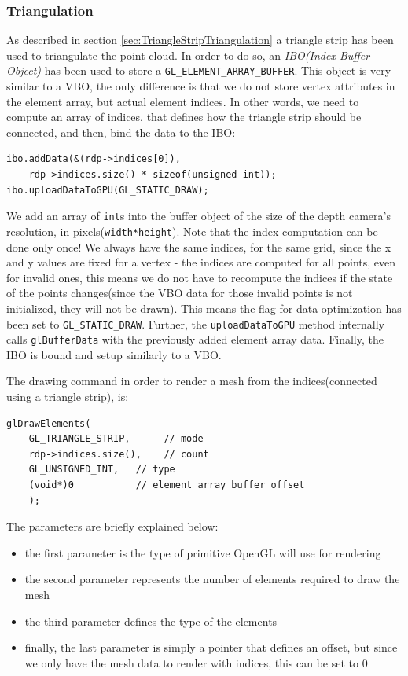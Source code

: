\documentclass[]{article}
\begin{document}
\subsubsection{Triangulation}

As described in section \ref{sec:TriangleStripTriangulation} a triangle strip has been used to triangulate the point cloud. In order to do so, an \textit{IBO(Index Buffer Object)} has been used to store a \verb|GL_ELEMENT_ARRAY_BUFFER|. This object is very similar to a VBO, the only difference is that we do not store vertex attributes in the element array, but actual element indices. In other words, we need to compute an array of indices, that defines how the triangle strip should be connected, and then, bind the data to the IBO:
\begin{verbatim}
ibo.addData(&(rdp->indices[0]), 
    rdp->indices.size() * sizeof(unsigned int));
ibo.uploadDataToGPU(GL_STATIC_DRAW);
\end{verbatim}

We add an array of \verb|int|s into the buffer object of the size of the depth camera's resolution, in pixels(\verb|width*height|). Note that the index computation can be done only once! We always have the same indices, for the same grid, since the x and y values are fixed for a vertex - the indices are computed for all points, even for invalid ones, this means we do not have to recompute the indices if the state of the points changes(since the VBO data for those invalid points is not initialized, they will not be drawn). This means the flag for data optimization has been set to \verb|GL_STATIC_DRAW|. Further, the \verb|uploadDataToGPU| method internally calls  \verb|glBufferData| with the previously added element array data. Finally, the IBO is bound and setup similarly to a VBO.

The drawing command in order to render a mesh from the indices(connected using a triangle strip), is:
\begin{verbatim}
glDrawElements(
	GL_TRIANGLE_STRIP,      // mode
	rdp->indices.size(),    // count
	GL_UNSIGNED_INT,   // type
	(void*)0           // element array buffer offset
	);
\end{verbatim}

The parameters are briefly explained below:
\begin{itemize}
\item the first parameter is the type of primitive OpenGL will use for rendering
\item the second parameter represents the number of elements required to draw the mesh
\item the third parameter defines the type of the elements 
\item finally, the last parameter is simply a pointer that defines an offset, but since we only have the mesh data to render with indices, this can be set to 0
\end{itemize}
 
\end{document}
